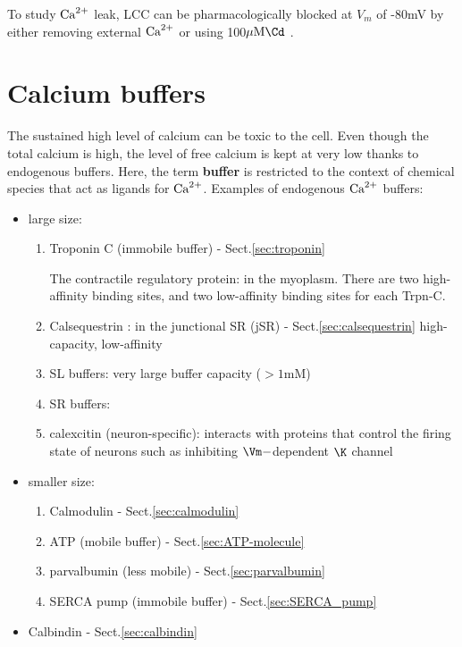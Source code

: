 To study ${\text{Ca}^{2+}}$ leak, LCC can be pharmacologically blocked at $V_m$ of -80mV by
either removing external ${\text{Ca}^{2+}}$ \citep{cheng1993cse} or using 100$\muM \Cd$
\citep{cheng1993cse, cannell1995b}.


\section{Calcium buffers}
\label{sec:buffers-calcium}
\label{sec:calcium-buffers}

The sustained high level of calcium can be toxic to the cell. Even though the
total calcium is high, the level of free calcium is kept at very low thanks to
endogenous buffers. Here, the term {\bf buffer} is restricted to the context of
chemical species that act as ligands for ${\text{Ca}^{2+}}$. Examples of endogenous ${\text{Ca}^{2+}}$
buffers:
\begin{itemize}
\item large size:
  \begin{enumerate}
  \item Troponin C (immobile buffer) - Sect.\ref{sec:troponin}
  
The contractile regulatory protein: in
  the myoplasm. There are two high-affinity binding sites, and two low-affinity
  binding sites for each Trpn-C.
 
  \item Calsequestrin : in the junctional SR (jSR) - Sect.\ref{sec:calsequestrin}
  high-capacity, low-affinity
  
  \item SL buffers: very large buffer capacity ($> 1$mM)
  \item SR buffers:
  
  \item calexcitin (neuron-specific): interacts with proteins that control the
  firing state of neurons such as inhibiting $\Vm-$dependent $\K$ channel
  
  \end{enumerate}

\item smaller size:
  \begin{enumerate}
  \item Calmodulin - Sect.\ref{sec:calmodulin}
  \item ATP (mobile buffer) - Sect.\ref{sec:ATP-molecule}
  \item parvalbumin (less mobile) - Sect.\ref{sec:parvalbumin}
  \item SERCA pump (immobile buffer) - Sect.\ref{sec:SERCA_pump}
  \end{enumerate}
  
\item Calbindin - Sect.\ref{sec:calbindin}
\end{itemize}

